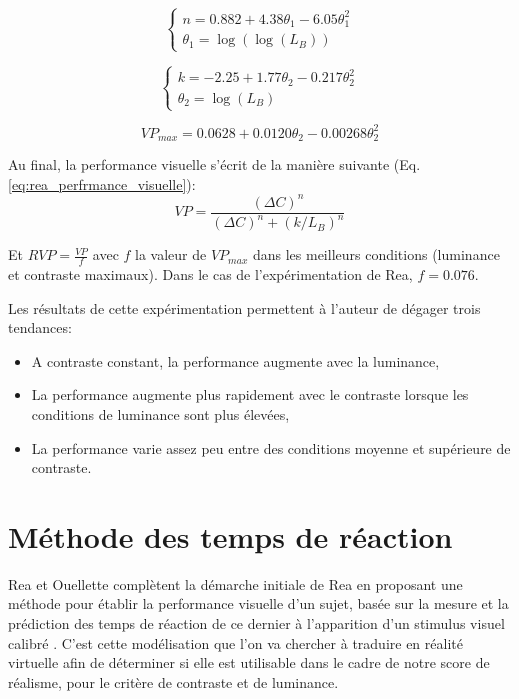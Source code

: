 	\begin{equation}
		\begin{cases}
		n =  0.882 + 4.38 \theta_1 - 6.05 \theta_1^2\\
		\theta_1 = \log(\log(L_B))
		\end{cases} 
		\label{eq:rea_n}
	\end{equation}
	
	\begin{equation}
		\begin{cases}
		k =  -2.25 + 1.77 \theta_2 - 0.217 \theta_2^2\\
		\theta_2 = \log(L_B)
		\end{cases} 
		\label{eq:rea_k}
	\end{equation}
	
	\begin{equation}
		VP_{max} = 0.0628 + 0.0120 \theta_2 - 0.00268 \theta_2^2
		\label{eq:rea_vpmax}
	\end{equation}
	
	\par Au final, la performance visuelle s'écrit de la manière suivante (Eq. \ref{eq:rea_perfrmance_visuelle}):
	\begin{equation}
		VP = \frac{(\Delta C)^n}{(\Delta C)^n + (k/L_B)^n}
		\label{eq:rea_perfrmance_visuelle}
	\end{equation}
	
	\par Et $RVP = \frac{VP}{f}$ avec $f$ la valeur de $VP_{max}$ dans les meilleurs conditions (luminance et contraste maximaux). Dans le cas de l'expérimentation de Rea, $f = 0.076$.
	
	\par Les résultats de cette expérimentation permettent à l'auteur de dégager trois tendances:
	\begin{itemize}
		\item A contraste constant, la performance augmente avec la luminance,
		\item La performance augmente plus rapidement avec le contraste lorsque les conditions de luminance sont plus élevées,
		\item La performance varie assez peu entre des conditions moyenne et supérieure de contraste.
	\end{itemize}
	
	\section{Méthode des temps de réaction}
	\par Rea et Ouellette complètent la démarche initiale de Rea en proposant une méthode pour établir la performance visuelle d'un sujet, basée sur la mesure et la prédiction des temps de réaction de ce dernier à l'apparition d'un stimulus visuel calibré \citep{rea_visual_1988, rea_relative_1991}. C'est cette modélisation que l'on va chercher à traduire en réalité virtuelle afin de déterminer si elle est utilisable dans le cadre de notre score de réalisme, pour le critère de contraste et de luminance.
	
